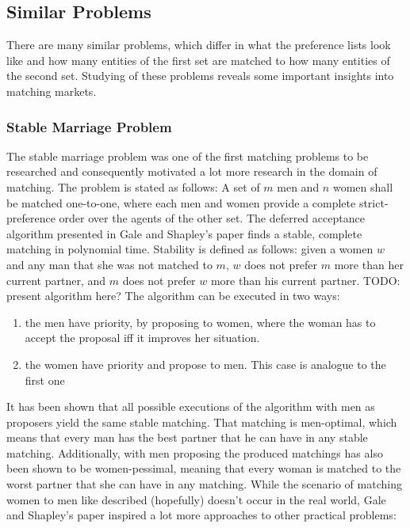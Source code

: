 \subsection{Similar Problems}
There are many similar problems, which differ in what the preference lists look like and how many entities of the first set are matched to how many entities of the second set. Studying of these problems reveals some important insights into matching markets.

\subsubsection{Stable Marriage Problem}
The stable marriage problem was one of the first matching problems to be researched\cite{GaleShapleyOrig} and consequently motivated a lot more research in the domain of matching.
\newline
The problem is stated as follows: A set of $m$ men and $n$ women shall be matched one-to-one, where each men and women provide a complete strict-preference order over the agents of the other set. The deferred acceptance algorithm presented in Gale and Shapley's paper\cite{GaleShapleyOrig}
finds a stable, complete matching in polynomial time. Stability is defined as follows: given a women $w$ and any man that she was not matched to $m$, $w$ does not prefer $m$ more than her current partner, and $m$ does not prefer $w$ more than his current partner. 
\newline
TODO: present algorithm here?
\newline
The algorithm can be executed in two ways: 
\begin{enumerate}
    \item the men have priority, by proposing to women, where the woman has to accept the proposal iff it improves her situation.  
    \item the women have priority and propose to men. This case is analogue to the first one
\end{enumerate}
It has been shown that all possible executions of the algorithm with men as proposers yield the same stable matching. That matching is men-optimal, which means that every man has the best partner that he can have in any stable matching.\cite{Gusfield} Additionally, with men proposing the produced matchings has also been shown to be women-pessimal, meaning that every woman is matched to the worst partner that she can have in any matching.\cite{Gusfield}
\newline
While the scenario of matching women to men like described (hopefully) doesn't occur in the real world, Gale and Shapley's paper inspired a lot more approaches to other practical problems:

